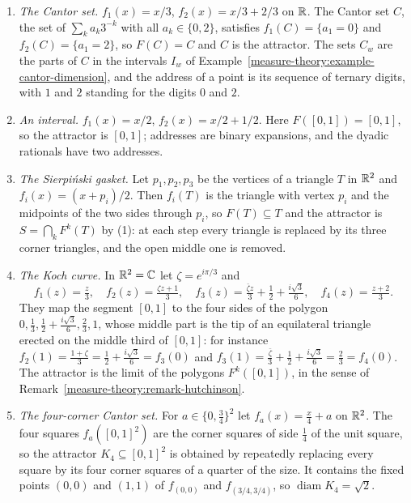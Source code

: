 \begin{example}\label{measure-theory:example-ifs}
\begin{enumerate}
\item \emph{The Cantor set.} $f_1(x) = x/3$, $f_2(x) = x/3 + 2/3$ on $\mathbb{R}$. The Cantor set $C$, the set of $\sum_ka_k3^{-k}$ with all $a_k \in \{0, 2\}$, satisfies $f_1(C) = \{a_1 = 0\}$ and
$f_2(C) = \{a_1 = 2\}$, so $F(C) = C$ and $C$ is the attractor. The sets $C_w$ are the parts of $C$ in the intervals $I_w$ of Example~\ref{measure-theory:example-cantor-dimension}, and the
address of a point is its sequence of ternary digits, with $1$ and $2$ standing for the digits $0$ and $2$.
\item \emph{An interval.} $f_1(x) = x/2$, $f_2(x) = x/2 + 1/2$. Here $F([0, 1]) = [0, 1]$, so the attractor is $[0, 1]$; addresses are binary expansions, and the dyadic rationals have two addresses.
\item \emph{The Sierpi\'nski gasket.} Let $p_1, p_2, p_3$ be the vertices of a triangle $T$ in $\mathbb{R}^2$ and $f_i(x) = (x + p_i)/2$. Then $f_i(T)$ is the triangle with vertex $p_i$ and the midpoints of the two
sides through $p_i$, so $F(T) \subseteq T$ and the attractor is $S = \bigcap_kF^k(T)$ by (1): at each step every triangle is replaced by its three corner triangles, and the open middle one is
removed.
\item \emph{The Koch curve.} In $\mathbb{R}^2 = \mathbb{C}$ let $\zeta = e^{i\pi/3}$ and
\[
f_1(z) = \tfrac z3, \quad f_2(z) = \tfrac{\zeta z + 1}{3}, \quad f_3(z) = \tfrac{\bar{\zeta}z}{3} + \tfrac12 + \tfrac{i\sqrt3}{6}, \quad f_4(z) = \tfrac{z + 2}{3}.
\]
They map the segment $[0, 1]$ to the four sides of the polygon $0, \frac13, \frac12 + \frac{i\sqrt3}{6}, \frac23, 1$, whose middle part is the tip of an equilateral triangle erected on the middle third
of $[0, 1]$: for instance $f_2(1) = \frac{1 + \zeta}{3} = \frac12 + \frac{i\sqrt3}{6} = f_3(0)$ and $f_3(1) = \frac{\bar{\zeta}}{3} + \frac12 + \frac{i\sqrt3}{6} = \frac23 = f_4(0)$. The attractor is the
limit of the polygons $F^k([0, 1])$, in the sense of Remark~\ref{measure-theory:remark-hutchinson}.
\item \emph{The four-corner Cantor set.} For $a \in \{0, \frac34\}^2$ let $f_a(x) = \frac x4 + a$ on $\mathbb{R}^2$. The four squares $f_a([0, 1]^2)$ are the corner squares of side $\frac14$ of the unit
square, so the attractor $K_4 \subseteq [0, 1]^2$ is obtained by repeatedly replacing every square by its four corner squares of a quarter of the size. It contains the fixed points $(0, 0)$ and
$(1, 1)$ of $f_{(0, 0)}$ and $f_{(3/4, 3/4)}$, so $\operatorname{diam}K_4 = \sqrt2$.
\end{enumerate}
\end{example}

